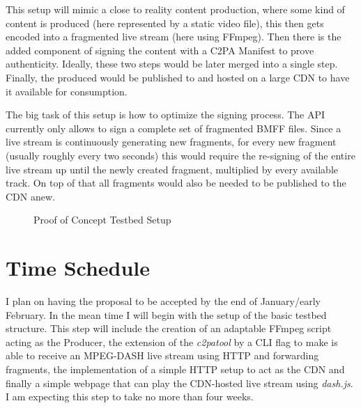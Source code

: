 \documentclass[a4paper]{article}
\begin{document}
This setup will mimic a close to reality content production, where some kind of content is produced (here represented by a static video file), this then gets encoded into a fragmented live stream (here using FFmpeg). Then there is the added component of signing the content with a C2PA Manifest to prove authenticity. Ideally, these two steps would be later merged into a single step. Finally, the produced would be published to and hosted on a large CDN to have it available for consumption.

The big task of this setup is how to optimize the signing process. The API currently only allows to sign a complete set of fragmented BMFF files. Since a live stream is continuously generating new fragments, for every new fragment (usually roughly every two seconds) this would require the re-signing of the entire live stream up until the newly created fragment, multiplied by every available track. On top of that all fragments would also be needed to be published to the CDN anew.

\begin{figure}
    \centering
    \caption{Proof of Concept Testbed Setup}
    \label{fig:setup}
\end{figure}

\section{Time Schedule} 

I plan on having the proposal to be accepted by the end of January/early February. In the mean time I will begin with the setup of the basic testbed structure. This step will include the creation of an adaptable FFmpeg script acting as the Producer, the extension of the \textit{c2patool} by a CLI flag to make is able to receive an MPEG-DASH live stream using HTTP and forwarding fragments, the implementation of a simple HTTP setup to act as the CDN and finally a simple webpage that can play the CDN-hosted live stream using \textit{dash.js}. I am expecting this step to take no more than four weeks.
\end{document}
